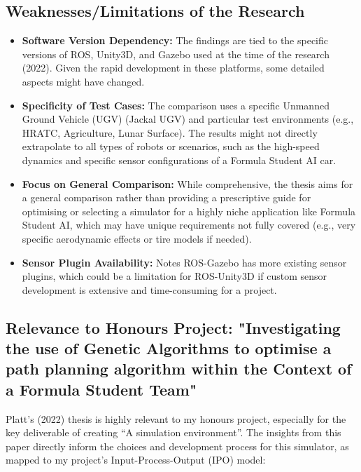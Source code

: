 \subsection{Weaknesses/Limitations of the Research}\label{subsec:weaknesses/limitations-of-the-research}
\begin{itemize}
    \item \textbf{Software Version Dependency:} The findings are tied to the specific versions of ROS, Unity3D, and Gazebo used at the time of the research (2022).
    Given the rapid development in these platforms, some detailed aspects might have changed.
    \item \textbf{Specificity of Test Cases:} The comparison uses a specific Unmanned Ground Vehicle (UGV) (Jackal UGV) and particular test environments (e.g., HRATC, Agriculture, Lunar Surface).
    The results might not directly extrapolate to all types of robots or scenarios, such as the high-speed dynamics and specific sensor configurations of a Formula Student AI car.
    \item \textbf{Focus on General Comparison:} While comprehensive, the thesis aims for a general comparison rather than providing a prescriptive guide for optimising or selecting a simulator for a highly niche application like Formula Student AI, which may have unique requirements not fully covered (e.g., very specific aerodynamic effects or tire models if needed).
    \item \textbf{Sensor Plugin Availability:} Notes ROS-Gazebo has more existing sensor plugins, which could be a limitation for ROS-Unity3D if custom sensor development is extensive and time-consuming for a project.
\end{itemize}

\subsection{Relevance to Honours Project: "Investigating the use of Genetic Algorithms to optimise a path planning algorithm within the Context of a Formula Student Team"}\label{subsec:relevance-to-honours-project:-"investigating-the-use-of-genetic-algorithms-to-optimise-a-path-planning-algorithm-within-the-context-of-a-formula-student-team"}

Platt's (2022) thesis is highly relevant to my honours project, especially for the key deliverable of creating ``A simulation environment''.
The insights from this paper directly inform the choices and development process for this simulator, as mapped to my project's Input-Process-Output (IPO) model:

